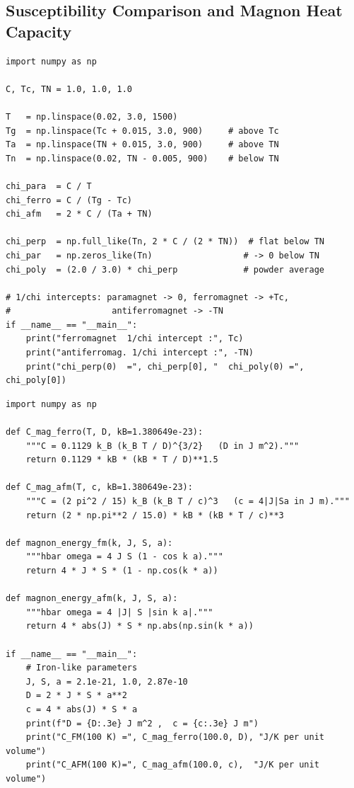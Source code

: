 \documentclass[11pt,a4paper]{article}
\begin{document}
\subsection{Susceptibility Comparison and Magnon Heat Capacity}

\begin{lstlisting}[caption={The three magnetic classes and their 1/chi behaviour.}]
import numpy as np

C, Tc, TN = 1.0, 1.0, 1.0

T   = np.linspace(0.02, 3.0, 1500)
Tg  = np.linspace(Tc + 0.015, 3.0, 900)     # above Tc
Ta  = np.linspace(TN + 0.015, 3.0, 900)     # above TN
Tn  = np.linspace(0.02, TN - 0.005, 900)    # below TN

chi_para  = C / T
chi_ferro = C / (Tg - Tc)
chi_afm   = 2 * C / (Ta + TN)

chi_perp  = np.full_like(Tn, 2 * C / (2 * TN))  # flat below TN
chi_par   = np.zeros_like(Tn)                  # -> 0 below TN
chi_poly  = (2.0 / 3.0) * chi_perp             # powder average

# 1/chi intercepts: paramagnet -> 0, ferromagnet -> +Tc,
#                    antiferromagnet -> -TN
if __name__ == "__main__":
    print("ferromagnet  1/chi intercept :", Tc)
    print("antiferromag. 1/chi intercept :", -TN)
    print("chi_perp(0)  =", chi_perp[0], "  chi_poly(0) =", chi_poly[0])
\end{lstlisting}

\begin{lstlisting}[caption={Magnon heat capacity: $T^{3/2}$ (ferromagnet) and $T^3$ (antiferromagnet).}]
import numpy as np

def C_mag_ferro(T, D, kB=1.380649e-23):
    """C = 0.1129 k_B (k_B T / D)^{3/2}   (D in J m^2)."""
    return 0.1129 * kB * (kB * T / D)**1.5

def C_mag_afm(T, c, kB=1.380649e-23):
    """C = (2 pi^2 / 15) k_B (k_B T / c)^3   (c = 4|J|Sa in J m)."""
    return (2 * np.pi**2 / 15.0) * kB * (kB * T / c)**3

def magnon_energy_fm(k, J, S, a):
    """hbar omega = 4 J S (1 - cos k a)."""
    return 4 * J * S * (1 - np.cos(k * a))

def magnon_energy_afm(k, J, S, a):
    """hbar omega = 4 |J| S |sin k a|."""
    return 4 * abs(J) * S * np.abs(np.sin(k * a))

if __name__ == "__main__":
    # Iron-like parameters
    J, S, a = 2.1e-21, 1.0, 2.87e-10
    D = 2 * J * S * a**2
    c = 4 * abs(J) * S * a
    print(f"D = {D:.3e} J m^2 ,  c = {c:.3e} J m")
    print("C_FM(100 K) =", C_mag_ferro(100.0, D), "J/K per unit volume")
    print("C_AFM(100 K)=", C_mag_afm(100.0, c),  "J/K per unit volume")
\end{lstlisting}
\end{document}
